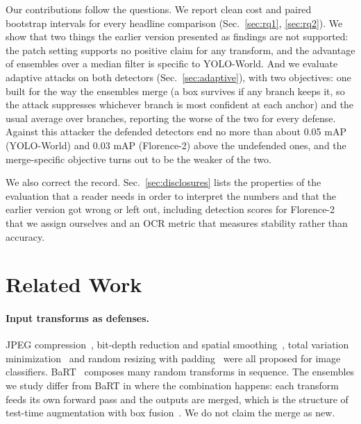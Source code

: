 \documentclass[11pt]{article}
\newcommand{\yw}{YOLO-World}
\newcommand{\fl}{Florence-2}
\begin{document}
Our contributions follow the questions. We report clean cost and paired
bootstrap intervals for every headline comparison (Sec.~\ref{sec:rq1},
\ref{sec:rq2}). We show that two things the earlier version presented as
findings are not supported: the patch setting supports no positive claim for
any transform, and the advantage of ensembles over a median filter is
specific to \yw{}. And we
evaluate adaptive attacks on both detectors (Sec.~\ref{sec:adaptive}), with
two objectives: one built for the way the ensembles merge (a box survives if
any branch keeps it, so the attack suppresses whichever branch is most
confident at each anchor) and the usual average over branches, reporting the
worse of the two for every defense. Against this attacker the defended
detectors end no more than about 0.05 mAP (\yw{}) and 0.03 mAP (\fl{}) above the undefended
ones, and the merge-specific objective turns out to be the weaker of the
two.

We also correct the record. Sec.~\ref{sec:disclosures} lists the properties
of the evaluation that a reader needs in order to interpret the numbers and
that the earlier version got wrong or left out, including detection scores
for \fl{} that we assign ourselves and an OCR metric that measures stability
rather than accuracy.

\section{Related Work}

\paragraph{Input transforms as defenses.}
JPEG compression~\cite{dziugaite2016study}, bit-depth reduction and spatial
smoothing~\cite{xu2018feature}, total variation
minimization~\cite{guo2018countering} and random resizing with
padding~\cite{xie2018mitigating} were all proposed for image classifiers.
BaRT~\cite{raff2019barrage} composes many random transforms in sequence. The
ensembles we study differ from BaRT in where the combination happens: each
transform feeds its own forward pass and the outputs are merged, which is the
structure of test-time augmentation with box
fusion~\cite{solovyev2021weighted}. We do not claim the merge as new.
\end{document}

